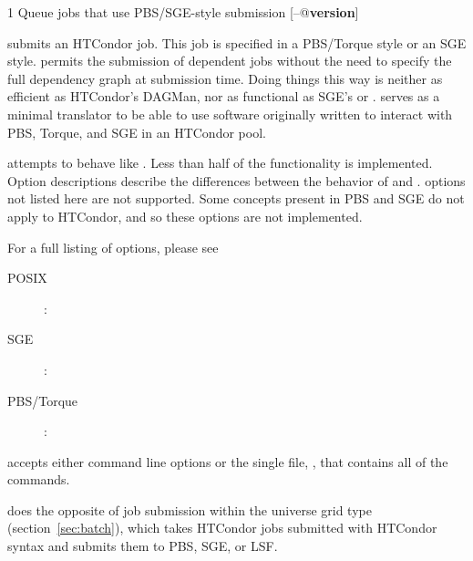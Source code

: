 \begin{ManPage}{\label{man-condor-qsub}}{1}
{Queue jobs that use PBS/SGE-style submission}
\Synopsis {}
[\verb@--@\textbf{version}]


\Description

 submits an HTCondor job.
This job is specified in a PBS/Torque style or an SGE style.
 permits the 
submission of dependent jobs without the need to specify the full
dependency graph at submission time.
Doing things this way is neither as efficient
as HTCondor's DAGMan, nor as functional as SGE's  or .
 serves as a minimal translator to be able to use 
software originally written to interact 
with PBS, Torque, and SGE in an HTCondor pool. 

 attempts to behave like . 
Less than half of the 
functionality is implemented. 
Option descriptions 
describe the differences between the behavior of  and 
.
 options not listed here are not supported.
Some concepts present in PBS and SGE do not apply to HTCondor,
and so these options are not implemented.

For a full listing of  options, please see
\begin{description}
\item[POSIX]: 
\item[SGE]: 
\item[PBS/Torque]: 
\end{description}

 accepts
either command line options or the single file, ,
that contains all of the commands. 

 does the opposite of job submission within the 
 universe 
 grid type (section~\ref{sec:batch}),
which takes HTCondor jobs submitted with HTCondor
syntax and submits them to PBS, SGE, or LSF.


\end{ManPage}
